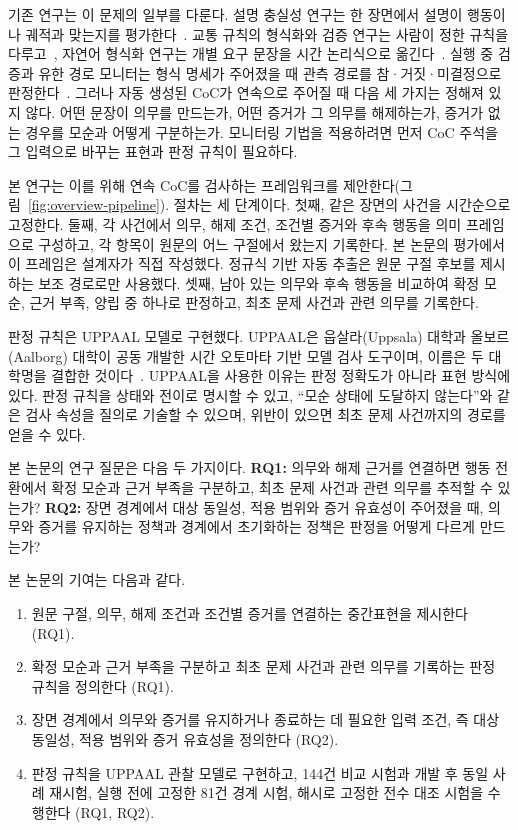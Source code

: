 \begin{revision}
기존 연구는 이 문제의 일부를 다룬다. 설명 충실성 연구는 한 장면에서 설명이 행동이나 궤적과 맞는지를 평가한다~\cite{mayumu2026faithfulness,nguyen2026vladrivebench,yu2026drivethoughts}. 교통 규칙의 형식화와 검증 연구는 사람이 정한 규칙을 다루고~\cite{esterle2020,maierhofer2020,wan2024}, 자연어 형식화 연구는 개별 요구 문장을 시간 논리식으로 옮긴다~\cite{chen2023nl2tl,cosler2023nl2spec}. 실행 중 검증과 유한 경로 모니터는 형식 명세가 주어졌을 때 관측 경로를 참·거짓·미결정으로 판정한다~\cite{leucker2009runtime,bauer2011runtime}. 그러나 자동 생성된 CoC가 연속으로 주어질 때 다음 세 가지는 정해져 있지 않다. 어떤 문장이 의무를 만드는가, 어떤 증거가 그 의무를 해제하는가, 증거가 없는 경우를 모순과 어떻게 구분하는가. 모니터링 기법을 적용하려면 먼저 CoC 주석을 그 입력으로 바꾸는 표현과 판정 규칙이 필요하다.

본 연구는 이를 위해 연속 CoC를 검사하는 프레임워크를 제안한다(그림~\ref{fig:overview-pipeline}). 절차는 세 단계이다. 첫째, 같은 장면의 사건을 시간순으로 고정한다. 둘째, 각 사건에서 의무, 해제 조건, 조건별 증거와 후속 행동을 의미 프레임으로 구성하고, 각 항목이 원문의 어느 구절에서 왔는지 기록한다. 본 논문의 평가에서 이 프레임은 설계자가 직접 작성했다. 정규식 기반 자동 추출은 원문 구절 후보를 제시하는 보조 경로로만 사용했다. 셋째, 남아 있는 의무와 후속 행동을 비교하여 확정 모순, 근거 부족, 양립 중 하나로 판정하고, 최초 문제 사건과 관련 의무를 기록한다.

판정 규칙은 UPPAAL 모델로 구현했다. UPPAAL은 웁살라(Uppsala) 대학과 올보르(Aalborg) 대학이 공동 개발한 시간 오토마타 기반 모델 검사 도구이며, 이름은 두 대학명을 결합한 것이다~\cite{uppaalofficial,uppaalname,behrmann2004uppaal}. UPPAAL을 사용한 이유는 판정 정확도가 아니라 표현 방식에 있다. 판정 규칙을 상태와 전이로 명시할 수 있고, ``모순 상태에 도달하지 않는다''와 같은 검사 속성을 질의로 기술할 수 있으며, 위반이 있으면 최초 문제 사건까지의 경로를 얻을 수 있다.

본 논문의 연구 질문은 다음 두 가지이다. \textbf{RQ1:} 의무와 해제 근거를 연결하면 행동 전환에서 확정 모순과 근거 부족을 구분하고, 최초 문제 사건과 관련 의무를 추적할 수 있는가? \textbf{RQ2:} 장면 경계에서 대상 동일성, 적용 범위와 증거 유효성이 주어졌을 때, 의무와 증거를 유지하는 정책과 경계에서 초기화하는 정책은 판정을 어떻게 다르게 만드는가?

본 논문의 기여는 다음과 같다.
\begin{enumerate}
\item
원문 구절, 의무, 해제 조건과 조건별 증거를 연결하는 중간표현을 제시한다 (RQ1).
\item
확정 모순과 근거 부족을 구분하고 최초 문제 사건과 관련 의무를 기록하는 판정 규칙을 정의한다 (RQ1).
\item
장면 경계에서 의무와 증거를 유지하거나 종료하는 데 필요한 입력 조건, 즉 대상 동일성, 적용 범위와 증거 유효성을 정의한다 (RQ2).
\item
판정 규칙을 UPPAAL 관찰 모델로 구현하고, 144건 비교 시험과 개발 후 동일 사례 재시험, 실행 전에 고정한 81건 경계 시험, 해시로 고정한 전수 대조 시험을 수행한다 (RQ1, RQ2).
\end{enumerate}


\end{revision}
